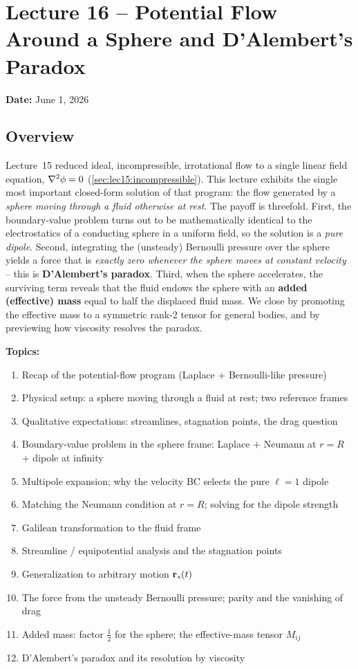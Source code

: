 \documentclass[../main.tex]{subfiles}
\begin{document}
\section{Lecture 16 -- Potential Flow Around a Sphere and D'Alembert's Paradox}\label{sec:lec16}
\begin{center}
  \textbf{Date:} June 1, 2026
\end{center}

\subsection*{Overview}
Lecture~15 reduced ideal, incompressible, irrotational flow to a single linear field equation, $\nabla^2\phi=0$ (\cref{sec:lec15:incompressible}). This lecture exhibits the single most important closed-form solution of that program: the flow generated by a \emph{sphere moving through a fluid otherwise at rest}. The payoff is threefold. First, the boundary-value problem turns out to be mathematically identical to the electrostatics of a conducting sphere in a uniform field, so the solution is a \emph{pure dipole}. Second, integrating the (unsteady) Bernoulli pressure over the sphere yields a force that is \emph{exactly zero whenever the sphere moves at constant velocity} -- this is \textbf{D'Alembert's paradox}. Third, when the sphere accelerates, the surviving term reveals that the fluid endows the sphere with an \textbf{added (effective) mass} equal to half the displaced fluid mass. We close by promoting the effective mass to a symmetric rank-2 tensor for general bodies, and by previewing how viscosity resolves the paradox.

\medskip\noindent\textbf{Topics:}
\begin{enumerate}
  \item Recap of the potential-flow program (Laplace $+$ Bernoulli-like pressure)
  \item Physical setup: a sphere moving through a fluid at rest; two reference frames
  \item Qualitative expectations: streamlines, stagnation points, the drag question
  \item Boundary-value problem in the sphere frame: Laplace $+$ Neumann at $r=R$ $+$ dipole at infinity
  \item Multipole expansion; why the velocity BC selects the pure $\ell=1$ dipole
  \item Matching the Neumann condition at $r=R$; solving for the dipole strength
  \item Galilean transformation to the fluid frame
  \item Streamline / equipotential analysis and the stagnation points
  \item Generalization to arbitrary motion $\mathbf{r}_s(t)$
  \item The force from the unsteady Bernoulli pressure; parity and the vanishing of drag
  \item Added mass: factor $\tfrac{1}{2}$ for the sphere; the effective-mass tensor $M_{ij}$
  \item D'Alembert's paradox and its resolution by viscosity
\end{enumerate}
\end{document}
